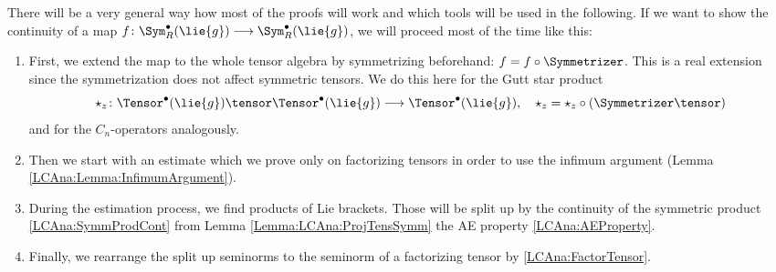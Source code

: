 There will be a very general way how most of the proofs will work and which 
tools will be used in the following. If we want to show the continuity of a 
map $f \colon \Sym_R^{\bullet}(\lie{g}) \longrightarrow 
\Sym_R^{\bullet}(\lie{g})$, we will proceed most of the time like this:
\begin{enumerate}
	\item \label{Item:LCAna:Step1}
	First, we extend the map to the whole tensor algebra by symmetrizing 
	beforehand: $f = f \circ \Symmetrizer$. This is a real extension since the 
	symmetrization does not affect symmetric tensors. We do this here for the 
	Gutt star product
	\begin{equation*}
		\ostar_z
		\colon
		\Tensor^{\bullet}(\lie{g})
		\tensor
		\Tensor^{\bullet}(\lie{g})
		\longrightarrow
		\Tensor^{\bullet}(\lie{g})
		, \quad
		\ostar_z 
		= 
		\star_z \circ 
		\left( \Symmetrizer \tensor \right)
	\end{equation*}
	and for the $C_n$-operators analogously.

	\item \label{Item:LCAna:Step2}
	Then we start with an estimate which we prove only on 
	factorizing tensors in order to use the infimum argument 
	(Lemma \ref{LCAna:Lemma:InfimumArgument}).

	\item \label{Item:LCAna:Step3}
	During the estimation process, we find products of Lie 
	brackets. Those will be split up by the continuity of the symmetric 
	product \eqref{LCAna:SymmProdCont} from Lemma 
	\ref{Lemma:LCAna:ProjTensSymm} the AE property \eqref{LCAna:AEProperty}.
	
	\item \label{Item:LCAna:Step4}
	Finally, we rearrange the split up seminorms to the seminorm of a 
	factorizing tensor by \eqref{LCAna:FactorTensor}.
\end{enumerate}



